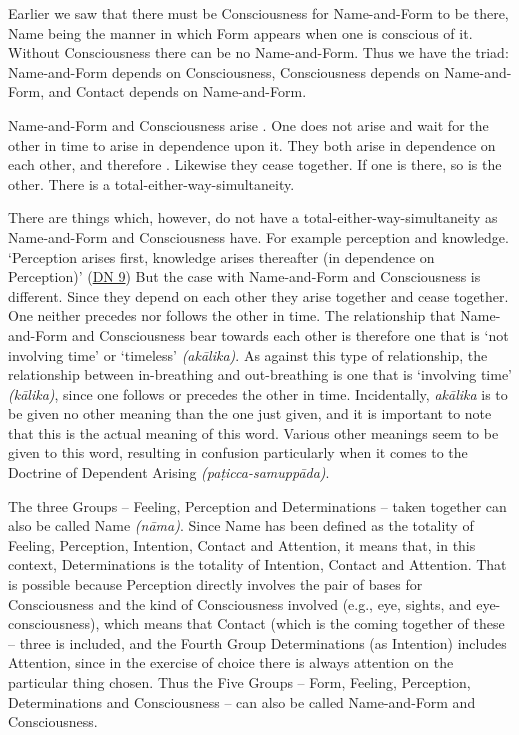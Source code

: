 Earlier we saw that there must be Consciousness for Name-and-Form to be there, Name being the manner in which Form appears when one is conscious of it. Without Consciousness there can be no Name-and-Form. Thus we have the triad: Name-and-Form depends on Consciousness, Consciousness depends on Name-and-Form, and Contact depends on Name-and-Form.

Name-and-Form and Consciousness arise . One does not arise and wait for the other in time to arise in dependence upon it. They both arise in dependence on each other, and therefore . Likewise they cease together. If one is there, so is the other. There is a total-either-way-simultaneity.

There are things which, however, do not have a total-either-way-simultaneity as Name-and-Form and Consciousness have. For example perception and knowledge. `Perception arises first, knowledge arises thereafter (in dependence on Perception)' (\href{https://suttacentral.net/dn9/en/thanissaro}{DN 9}) But the case with Name-and-Form and Consciousness is different. Since they depend on each other they arise together and cease together. One neither precedes nor follows the other in time. The relationship that Name-and-Form and Consciousness bear towards each other is therefore one that is `not involving time' or `timeless' \emph{(akālika)}. As against this type of relationship, the relationship between in-breathing and out-breathing is one that is `involving time' \emph{(kālika)}, since one follows or precedes the other in time. Incidentally, \emph{akālika} is to be given no other meaning than the one just given, and it is important to note that this is the actual meaning of this word. Various other meanings seem to be given to this word, resulting in confusion particularly when it comes to the Doctrine of Dependent Arising \emph{(paṭicca-samuppāda)}.

The three Groups -- Feeling, Perception and Determinations -- taken together can also be called Name \emph{(nāma)}. Since Name has been defined as the totality of Feeling, Perception, Intention, Contact and Attention, it means that, in this context, Determinations is the totality of Intention, Contact and Attention. That is possible because Perception directly involves the pair of bases for Consciousness and the kind of Consciousness involved (e.g., eye, sights, and eye-consciousness), which means that Contact (which is the coming together of these -- three is included, and the Fourth Group Determinations (as Intention) includes Attention, since in the exercise of choice there is always attention on the particular thing chosen. Thus the Five Groups -- Form, Feeling, Perception, Determinations and Consciousness -- can also be called Name-and-Form and Consciousness.
